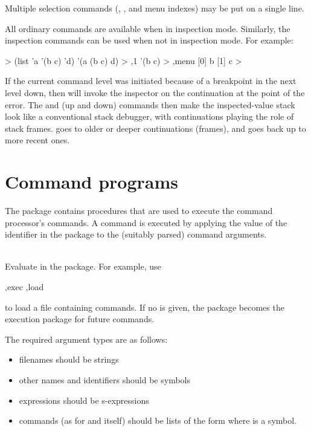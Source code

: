 Multiple selection commands (, , and menu indexes)
 may be put on a single line.


All ordinary commands are available when in inspection mode.
Similarly, the inspection commands can be used when not in inspection
 mode.
For example:
\begin{example}
> (list 'a '(b c) 'd)
'(a (b c) d)
> ,1
'(b c)
> ,menu
[0] b
[1] c
> 
\end{example}

If the current command level was initiated because of
 a breakpoint in the next level down, then 
  will invoke the inspector on the
 continuation at the point of the error.
The  and  (up and down)
commands then make the inspected-value stack look like a conventional stack
debugger, with continuations playing the role of stack frames.   goes
to older or deeper continuations (frames), and  goes back up to more
recent ones.

\section{Command programs}
\label{command-programs}

The  package contains procedures that are used
 to execute the command processor's commands.
A command  is executed by applying the value of
 the identifier  in the  package to
 the (suitably parsed) command arguments.

\begin{description}
\item {}\\
   Evaluate  in the  package.
   For example, use
\begin{example}
,exec ,load 
\end{example}
to load a file containing commands.
If no  is given, the  package becomes the
 execution package for future commands.
\end{description}

The required argument types are as follows:
\begin{itemize}
\item filenames should be strings
\item other names and identifiers should be symbols
\item expressions should be s-expressions
\item commands (as for  and  itself)
 should be lists of the form
 where  is a symbol.
\end{itemize}

